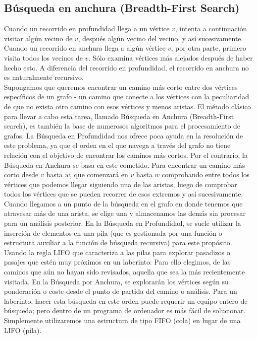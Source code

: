 \subsection{Búsqueda en anchura (Breadth-First Search)}

Cuando un recorrido en profundidad llega a un vértice $v$, intenta a continuación visitar algún vecino de $v$, después algún vecino del vecino, y así sucesivamente. Cuando un recorrido en anchura llega a algún vértice $v$, por otra parte, primero visita todos los vecinos de $v$. Sólo examina vértices más alejados después de haber hecho esto. A diferencia del recorrido en profundidad, el recorrido en anchura no es naturalmente recursivo.\\

Supongamos que queremos encontrar un camino más corto entre dos vértices específicos de un grafo - un camino que conecte a los vértices con la peculiaridad de que no exista otro camino con esos vértices y menos aristas. El método clásico para llevar a cabo esta tarea, llamado Búsqueda en Anchura (Breadth-First search), es también la base de numerosos algoritmos para el procesamiento de grafos. La Búsqueda en Profundidad nos ofrece poca ayuda en la resolución de este problema, ya que el orden en el que navega a través del grafo no tiene relación con el objetivo de encontrar los caminos más cortos. Por el contrario, la Búsqueda en Anchura se basa en este cometido. Para encontrar un camino más corto desde $v$ hasta $w$, que comenzará en $v$ hasta $w$ comprobando entre todos los vértices que podemos llegar siguiendo una de las aristas, luego de comprobar todos los vértices que se pueden recorrer de esos extremos y así sucesivamente.\\

Cuando llegamos a un punto de la búsqueda en el grafo en donde tenemos que atravesar más de una arista, se elige una y almacenamos las demás sin procesar para un análisis posterior. En la Búsqueda en Profundidad, se suele utilizar la inserción de elementos en una pila (que es gestionada por una función o estructura auxiliar a la función de búsqueda recursiva) para este propósito. Usando la regla LIFO que caracteriza a las pilas para explorar pasadizos o pasajes que estén muy próximos en un laberinto: Para ello elegimos, de las caminos que aún no hayan sido revisados, aquella que sea la más recientemente visitada. En la Búsqueda por Anchura, se explorarán los vértices según su ponderación o coste desde el punto de partida del camino o análisis. Para un laberinto, hacer esta búsqueda en este orden puede requerir un equipo entero de búsqueda; pero dentro de un programa de ordenador es más fácil de solucionar. Simplemente utilizaremos una estructura de tipo FIFO (cola) en lugar de una LIFO (pila).\\

